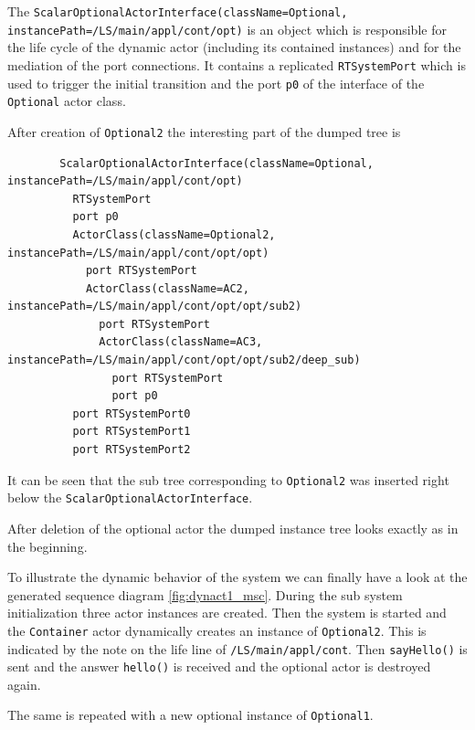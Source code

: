 The \texttt{ScalarOptionalActorInterface(className=Optional, instancePath=/LS/main/appl/cont/opt)} is an object which is
responsible for the life cycle of the dynamic actor (including its contained instances) and for the mediation of the
port connections. It contains a replicated \texttt{RTSystemPort} which is used to trigger the initial transition and the
port \texttt{p0} of the interface of the \texttt{Optional} actor class.

After creation of \texttt{Optional2} the interesting part of the dumped tree is

\begin{verbatim}
        ScalarOptionalActorInterface(className=Optional, instancePath=/LS/main/appl/cont/opt)
          RTSystemPort
          port p0
          ActorClass(className=Optional2, instancePath=/LS/main/appl/cont/opt/opt)
            port RTSystemPort
            ActorClass(className=AC2, instancePath=/LS/main/appl/cont/opt/opt/sub2)
              port RTSystemPort
              ActorClass(className=AC3, instancePath=/LS/main/appl/cont/opt/opt/sub2/deep_sub)
                port RTSystemPort
                port p0
          port RTSystemPort0
          port RTSystemPort1
          port RTSystemPort2
\end{verbatim}

It can be seen that the sub tree corresponding to \texttt{Optional2} was inserted right below the
\texttt{ScalarOptionalActorInterface}.

After deletion of the optional actor the dumped instance tree looks exactly as in the beginning.

To illustrate the dynamic behavior of the system we can finally have a look at the generated
sequence diagram \ref{fig:dynact1_msc}. During the sub system initialization three actor
instances are created. Then the system is started and the \texttt{Container} actor dynamically creates
an instance of \texttt{Optional2}. This is indicated by the note on the life line of \texttt{/LS/main/appl/cont}.
Then \texttt{sayHello()} is sent and the answer \texttt{hello()} is received and the optional actor
is destroyed again.

The same is repeated with a new optional instance of \texttt{Optional1}.

